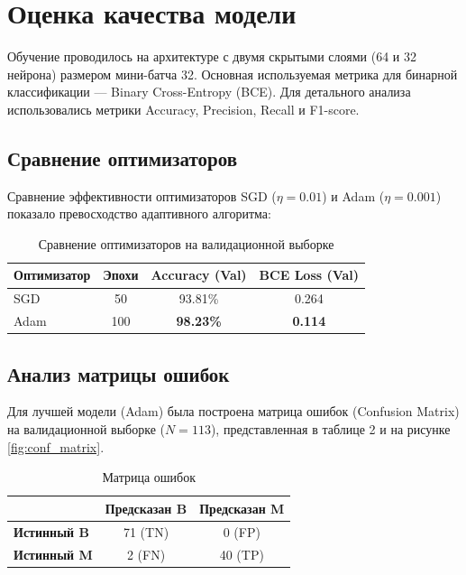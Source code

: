 \documentclass[a4paper,14pt]{extarticle}
\begin{document}
\section{Оценка качества модели}
Обучение проводилось на архитектуре с двумя скрытыми слоями (64 и 32 нейрона) размером мини-батча 32. 
Основная используемая метрика для бинарной классификации — Binary Cross-Entropy (BCE). Для детального анализа использовались метрики Accuracy, Precision, Recall и F1-score.

\subsection{Сравнение оптимизаторов}
Сравнение эффективности оптимизаторов SGD ($\eta = 0.01$) и Adam ($\eta = 0.001$) показало превосходство адаптивного алгоритма:

\begin{table}[h!]
    \centering
    \begin{tabular}{l c c c}
        \toprule
        \textbf{Оптимизатор} & \textbf{Эпохи} & \textbf{Accuracy (Val)} & \textbf{BCE Loss (Val)} \\
        \midrule
        SGD & 50 & 93.81\% & 0.264 \\
        Adam & 100 & \textbf{98.23\%} & \textbf{0.114} \\
        \bottomrule
    \end{tabular}
    \caption{Сравнение оптимизаторов на валидационной выборке}
\end{table}

\subsection{Анализ матрицы ошибок}
Для лучшей модели (Adam) была построена матрица ошибок (Confusion Matrix) на валидационной выборке ($N=113$), представленная в таблице 2 и на рисунке \ref{fig:conf_matrix}.

\begin{table}[h!]
    \centering
    \begin{tabular}{l c c}
        \toprule
         & \textbf{Предсказан B} & \textbf{Предсказан M} \\
        \midrule
        \textbf{Истинный B} & 71 (TN) & 0 (FP) \\
        \textbf{Истинный M} & 2 (FN) & 40 (TP) \\
        \bottomrule
    \end{tabular}
    \caption{Матрица ошибок}
\end{table}
\end{document}

